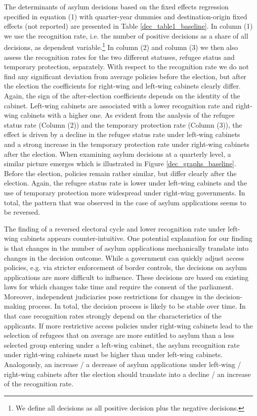 \documentclass[a4paper,12pt]{article}
\begin{document}
The determinants of asylum decisions based on the fixed effects regression specified in equation (1) with quarter-year dummies and destination-origin fixed effects (not reported) are presented in Table \ref{dec_table1_baseline}. In column (1) we use the recognition rate, i.e. the number of positive decisions as a share of all decisions, as dependent variable.\footnote{We define all decisions as all positive decision plus the negative decisions.} In column (2) and column (3) we then also assess the recognition rates for the two different statuses,  refugee status and temporary protection, separately. With respect to the recognition rate we do not find any significant deviation from average policies before the election, but after the election the coefficients for right-wing and left-wing cabinets clearly differ. Again, the sign of the after-election coefficients depends on the identity of the cabinet. Left-wing cabinets are associated with a lower recognition rate and right-wing cabinets with a higher one. As evident from the analysis of the refugee status rate (Column (2)) and the temporary protection rate (Column (3)), the effect is driven by a decline in the refugee status rate under left-wing cabinets and a strong increase in the temporary protection rate under right-wing cabinets after the election. When examining asylum decisions at a quarterly level, a similar picture emerges which is illustrated in Figure \ref{dec_graphs_baseline}.  Before the election, policies remain rather similar, but differ clearly after the election. Again, the refugee status rate is lower under left-wing cabinets and the use of temporary protection more widespread under right-wing governments. In total, the pattern that was observed in the case of asylum applications seems to be reversed.

The finding of a reversed electoral cycle and lower recognition rate under left-wing cabinets appears counter-intuitive. One potential explanation for our finding is that changes in the number of asylum applications mechanically translate into changes in the decision outcome. While a government can quickly adjust access policies, e.g. via stricter enforcement of border controls, the decisions on asylum applications are more difficult to influence. These decisions are based on existing laws for which changes take time and require the consent of the parliament. Moreover, independent judiciaries pose restrictions for changes in the decision-making process. In total, the decision process is likely to be stable over time. In that case  recognition rates strongly depend on the characteristics of the applicants. If more restrictive access policies under right-wing cabinets lead to the selection of refugees that on average are more entitled to asylum than a less selected group entering under a left-wing cabinet, the asylum recognition rate under right-wing cabinets must be higher than under left-wing cabinets. Analogously, an increase / a decrease of asylum applications under left-wing / right-wing cabinets after the election should translate into a decline / an increase of the recognition rate.
\end{document}
